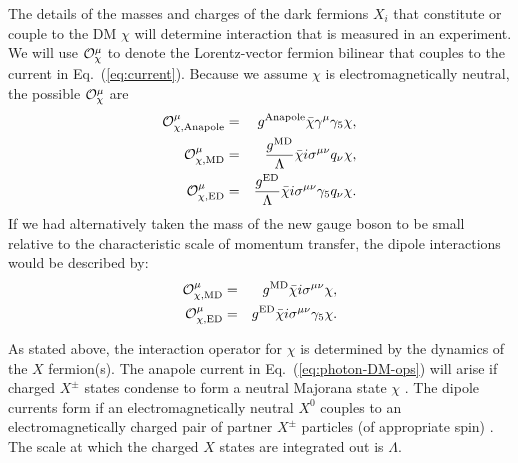 \documentclass[11pt]{article}
\newcommand{\Eq}[1]{Eq.~(\ref{#1})} \newcommand{\Eqs}[2]{Eqs.~(\ref{#1}) and (\ref{#2})} \newcommand{\Eqm}[2]{Eqs.~(\ref{#1}) through (\ref{#2})}
\begin{document}
The details of the masses and charges of the dark fermions $X_i$ that constitute or couple to the DM $\chi$ will determine interaction that is measured in an experiment. We will use ${\cal O}_\chi^\mu$ to denote the Lorentz-vector fermion bilinear that couples to the current in \Eq{eq:current}. Because we assume $\chi$ is electromagnetically neutral, the possible ${\cal O}_\chi^\mu$ are \cite{Gresham:2014vja, Gluscevic:2015sqa}
\begin{eqnarray} \label{eq:photon-DM-ops}
{\cal O}_{\rm \chi, Anapole}^\mu & = & g^{\rm Anapole}\bar \chi \gamma^\mu \gamma_5 \chi, \\
{\cal O}_{\rm \chi, MD}^\mu & = & \frac{g^{\rm MD}}{\Lambda}\bar \chi i \sigma^{\mu \nu} q_\nu \chi ,\\
{\cal O}_{\rm \chi, ED}^\mu & = & \frac{g^{\rm ED}}{\Lambda} \bar \chi i \sigma^{\mu \nu} \gamma_5 q_\nu \chi.
\end{eqnarray}
If we had alternatively taken the mass of the new gauge boson to be small relative to the characteristic scale of momentum transfer, the dipole interactions would be described by:
\begin{eqnarray} \label{eq:photon-DM-ops}
{\cal O}_{\rm \chi, MD}^\mu & = & g^{\rm MD}\bar \chi i \sigma^{\mu \nu}  \chi ,\\
{\cal O}_{\rm \chi, ED}^\mu & = & g^{\rm ED} \bar \chi i \sigma^{\mu \nu} \gamma_5 \chi.
\end{eqnarray}

As stated above, the interaction operator for $\chi$ is determined by the dynamics of the $X$ fermion(s). The anapole current in \Eq{eq:photon-DM-ops} will arise if charged $X^\pm$ states condense to form a neutral Majorana state $\chi$ \cite{Bagnasco:1993st}. The dipole currents form if an electromagnetically neutral $X^0$ couples to an electromagnetically charged pair of partner $X^\pm$ particles (of appropriate spin) \cite{Weiner:2012gm}. The scale at which the charged $X$ states are integrated out is $\Lambda$.
\end{document}
